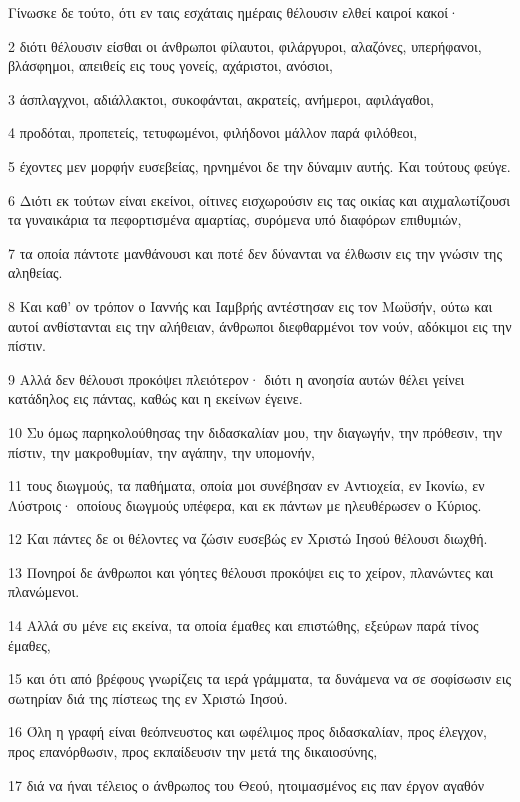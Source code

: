 \par Γίνωσκε δε τούτο, ότι εν ταις εσχάταις ημέραις θέλουσιν ελθεί καιροί κακοί·
\par 2 διότι θέλουσιν είσθαι οι άνθρωποι φίλαυτοι, φιλάργυροι, αλαζόνες, υπερήφανοι, βλάσφημοι, απειθείς εις τους γονείς, αχάριστοι, ανόσιοι,
\par 3 άσπλαγχνοι, αδιάλλακτοι, συκοφάνται, ακρατείς, ανήμεροι, αφιλάγαθοι,
\par 4 προδόται, προπετείς, τετυφωμένοι, φιλήδονοι μάλλον παρά φιλόθεοι,
\par 5 έχοντες μεν μορφήν ευσεβείας, ηρνημένοι δε την δύναμιν αυτής. Και τούτους φεύγε.
\par 6 Διότι εκ τούτων είναι εκείνοι, οίτινες εισχωρούσιν εις τας οικίας και αιχμαλωτίζουσι τα γυναικάρια τα πεφορτισμένα αμαρτίας, συρόμενα υπό διαφόρων επιθυμιών,
\par 7 τα οποία πάντοτε μανθάνουσι και ποτέ δεν δύνανται να έλθωσιν εις την γνώσιν της αληθείας.
\par 8 Και καθ' ον τρόπον ο Ιαννής και Ιαμβρής αντέστησαν εις τον Μωϋσήν, ούτω και αυτοί ανθίστανται εις την αλήθειαν, άνθρωποι διεφθαρμένοι τον νούν, αδόκιμοι εις την πίστιν.
\par 9 Αλλά δεν θέλουσι προκόψει πλειότερον· διότι η ανοησία αυτών θέλει γείνει κατάδηλος εις πάντας, καθώς και η εκείνων έγεινε.
\par 10 Συ όμως παρηκολούθησας την διδασκαλίαν μου, την διαγωγήν, την πρόθεσιν, την πίστιν, την μακροθυμίαν, την αγάπην, την υπομονήν,
\par 11 τους διωγμούς, τα παθήματα, οποία μοι συνέβησαν εν Αντιοχεία, εν Ικονίω, εν Λύστροις· οποίους διωγμούς υπέφερα, και εκ πάντων με ηλευθέρωσεν ο Κύριος.
\par 12 Και πάντες δε οι θέλοντες να ζώσιν ευσεβώς εν Χριστώ Ιησού θέλουσι διωχθή.
\par 13 Πονηροί δε άνθρωποι και γόητες θέλουσι προκόψει εις το χείρον, πλανώντες και πλανώμενοι.
\par 14 Αλλά συ μένε εις εκείνα, τα οποία έμαθες και επιστώθης, εξεύρων παρά τίνος έμαθες,
\par 15 και ότι από βρέφους γνωρίζεις τα ιερά γράμματα, τα δυνάμενα να σε σοφίσωσιν εις σωτηρίαν διά της πίστεως της εν Χριστώ Ιησού.
\par 16 Όλη η γραφή είναι θεόπνευστος και ωφέλιμος προς διδασκαλίαν, προς έλεγχον, προς επανόρθωσιν, προς εκπαίδευσιν την μετά της δικαιοσύνης,
\par 17 διά να ήναι τέλειος ο άνθρωπος του Θεού, ητοιμασμένος εις παν έργον αγαθόν

